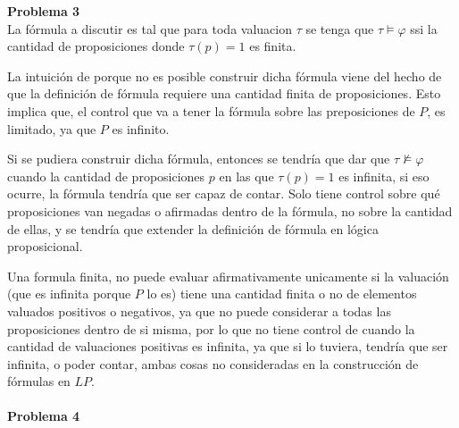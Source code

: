 \documentclass[letterpaper,10pt]{article}
\begin{document}
\textbf{Problema 3}\\

La fórmula a discutir es tal que para toda valuacion $\tau$ se tenga que $\tau \models \varphi$ ssi la cantidad de proposiciones donde $\tau(p) = 1$ es finita.

La intuición de porque no es posible construir dicha fórmula viene del hecho de que la definición de fórmula requiere una cantidad finita de proposiciones. Esto implica que, el control que va a tener la fórmula sobre las preposiciones de $P$, es limitado, ya que $P$ es infinito.


Si se pudiera construir dicha fórmula, entonces se tendría que dar que $\tau \not\models \varphi$ cuando la cantidad de proposiciones $p$ en las que $\tau(p)=1$ es infinita, si eso ocurre, la fórmula tendría que ser capaz de contar. Solo tiene control sobre qué proposiciones van negadas o afirmadas dentro de la fórmula, no sobre la cantidad de ellas, y se tendría que extender la definición de fórmula en lógica proposicional.

Una formula finita, no puede evaluar afirmativamente unicamente si la valuación (que es infinita porque $P$ lo es) tiene una cantidad finita o no de elementos valuados positivos o negativos, ya que no puede considerar a todas las proposiciones dentro de si misma, por lo que no tiene control de cuando la cantidad de valuaciones positivas es infinita, ya que si lo tuviera, tendría que ser infinita, o poder contar, ambas cosas no consideradas en la construcción de fórmulas en $LP$.
\\\\

\textbf{Problema 4}
\end{document}

